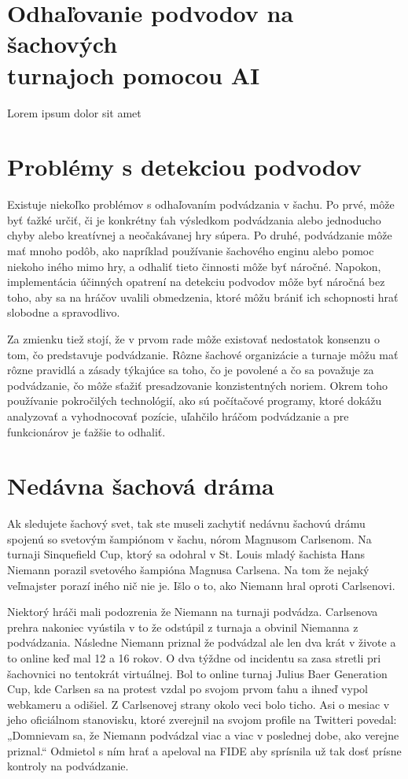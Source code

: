 \documentclass[10pt,oneside,slovak,a4paper]{article}
\begin{document}
\section{Odhaľovanie podvodov na šachových\\
	 turnajoch pomocou AI}

Lorem ipsum dolor sit amet


\section{Problémy s detekciou podvodov}

Existuje niekoľko problémov s odhaľovaním podvádzania v šachu. Po prvé, môže byť ťažké určiť, či je konkrétny ťah výsledkom podvádzania alebo jednoducho chyby alebo kreatívnej a neočakávanej hry súpera. Po druhé, podvádzanie môže mať mnoho podôb, ako napríklad používanie šachového enginu alebo pomoc niekoho iného mimo hry, a odhaliť tieto činnosti môže byť náročné. Napokon, implementácia účinných opatrení na detekciu podvodov môže byť náročná bez toho, aby sa na hráčov uvalili obmedzenia, ktoré môžu brániť ich schopnosti hrať slobodne a spravodlivo.

Za zmienku tiež stojí, že v prvom rade môže existovať nedostatok konsenzu o tom, čo predstavuje podvádzanie. Rôzne šachové organizácie a turnaje môžu mať rôzne pravidlá a zásady týkajúce sa toho, čo je povolené a čo sa považuje za podvádzanie, čo môže sťažiť presadzovanie konzistentných noriem. Okrem toho používanie pokročilých technológií, ako sú počítačové programy, ktoré dokážu analyzovať a vyhodnocovať pozície, uľahčilo hráčom podvádzanie a pre funkcionárov je ťažšie to odhaliť.


\section{Nedávna šachová dráma}

Ak sledujete šachový svet, tak ste museli zachytiť nedávnu šachovú drámu spojenú so svetovým šampiónom v šachu, nórom Magnusom Carlsenom. Na turnaji Sinquefield Cup, ktorý sa odohral v St. Louis mladý šachista Hans Niemann porazil svetového šampióna Magnusa Carlsena. Na tom že nejaký veľmajster porazí iného nič nie je. Išlo o to, ako Niemann hral oproti Carlsenovi.

Niektorý hráči mali podozrenia že Niemann na turnaji podvádza. Carlsenova prehra nakoniec vyústila v to že odstúpil z turnaja a obvinil Niemanna z podvádzania. Následne Niemann priznal že podvádzal ale len dva krát v živote a to online keď mal 12 a 16 rokov. O dva týždne od incidentu sa zasa stretli pri šachovnici no tentokrát virtuálnej. Bol to online turnaj Julius Baer Generation Cup, kde Carlsen sa na protest vzdal po svojom prvom ťahu a ihneď vypol webkameru a odišiel. Z Carlsenovej strany okolo veci bolo ticho. Asi o mesiac v jeho oficiálnom stanovisku, ktoré zverejnil na svojom profile na Twitteri povedal: „Domnievam sa, že Niemann podvádzal viac a viac v poslednej dobe, ako verejne priznal.“\cite{TWI} Odmietol s ním hrať a apeloval na FIDE aby sprísnila už tak dosť prísne kontroly na podvádzanie.
\end{document}

